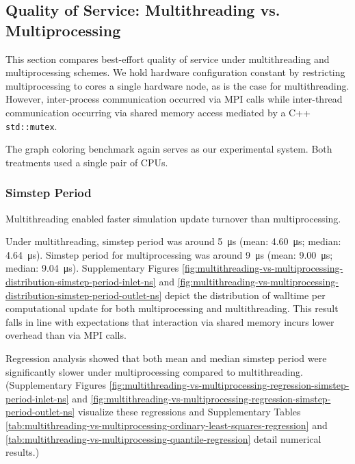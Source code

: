 \subsection{Quality of Service: Multithreading vs. Multiprocessing}
\label{sec:multithreading-vs-multiprocessing}

This section compares best-effort quality of service under multithreading and multiprocessing schemes.
We hold hardware configuration constant by restricting multiprocessing to cores a single hardware node, as is the case for multithreading.
However, inter-process communication occurred via MPI calls while inter-thread communication occurring via shared memory access mediated by a C++ \texttt{std::mutex}.

The graph coloring benchmark again serves as our experimental system.
Both treatments used a single pair of CPUs.

\subsubsection{Simstep Period}

Multithreading enabled faster simulation update turnover than multiprocessing.

Under multithreading, simstep period was around \SI{5}{\micro\second} (mean: \SI{4.60}{\micro\second}; median: \SI{4.64}{\micro\second}).
Simstep period for multiprocessing was around \SI{9}{\micro\second} (mean: \SI{9.00}{\micro\second}; median: \SI{9.04}{\micro\second}).
Supplementary Figures \ref{fig:multithreading-vs-multiprocessing-distribution-simstep-period-inlet-ns} and \ref{fig:multithreading-vs-multiprocessing-distribution-simstep-period-outlet-ns} depict the distribution of walltime per computational update for both multiprocessing and multithreading.
This result falls in line with expectations that interaction via shared memory incurs lower overhead than via MPI calls.

Regression analysis showed that both mean and median simstep period were significantly slower under multiprocessing compared to multithreading.
(Supplementary Figures \ref{fig:multithreading-vs-multiprocessing-regression-simstep-period-inlet-ns} and \ref{fig:multithreading-vs-multiprocessing-regression-simstep-period-outlet-ns} visualize these regressions and Supplementary Tables \ref{tab:multithreading-vs-multiprocessing-ordinary-least-squares-regression} and \ref{tab:multithreading-vs-multiprocessing-quantile-regression} detail numerical results.)

